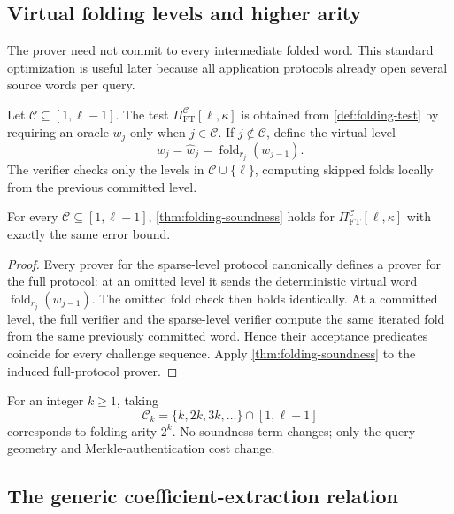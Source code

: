 \subsection{Virtual folding levels and higher arity}
\label{sec:virtual-folding-levels}

The prover need not commit to every intermediate folded word.  This standard optimization is useful later because all application protocols already open several source words per query.

\begin{definition}
\label{def:committed-folding-levels}
Let $\mathcal C\subseteq[1,\ell-1]$.  The test $\Pi^{\mathcal C}_{\mathrm{FT}}[\ell,\kappa]$ is obtained from \cref{def:folding-test} by requiring an oracle $w_j$ only when $j\in\mathcal C$.  If $j\notin\mathcal C$, define the virtual level
\[
  w_j=\widehat w_j=\operatorname{fold}_{r_j}(w_{j-1}).
\]
The verifier checks only the levels in $\mathcal C\cup\{\ell\}$, computing skipped folds locally from the previous committed level.
\end{definition}

\begin{proposition}
\label{prop:virtual-levels}
For every $\mathcal C\subseteq[1,\ell-1]$, \cref{thm:folding-soundness} holds for $\Pi^{\mathcal C}_{\mathrm{FT}}[\ell,\kappa]$ with exactly the same error bound.
\end{proposition}

\begin{proof}
Every prover for the sparse-level protocol canonically defines a prover for the full protocol: at an omitted level it sends the deterministic virtual word $\operatorname{fold}_{r_j}(w_{j-1})$.  The omitted fold check then holds identically.  At a committed level, the full verifier and the sparse-level verifier compute the same iterated fold from the same previously committed word.  Hence their acceptance predicates coincide for every challenge sequence.  Apply \cref{thm:folding-soundness} to the induced full-protocol prover.
\end{proof}

For an integer $k\ge1$, taking
\[
  \mathcal C_k=\{k,2k,3k,\ldots\}\cap[1,\ell-1]
\]
corresponds to folding arity $2^k$.  No soundness term changes; only the query geometry and Merkle-authentication cost change.

\subsection{The generic coefficient-extraction relation}
\label{sec:generic-ce-relation}

